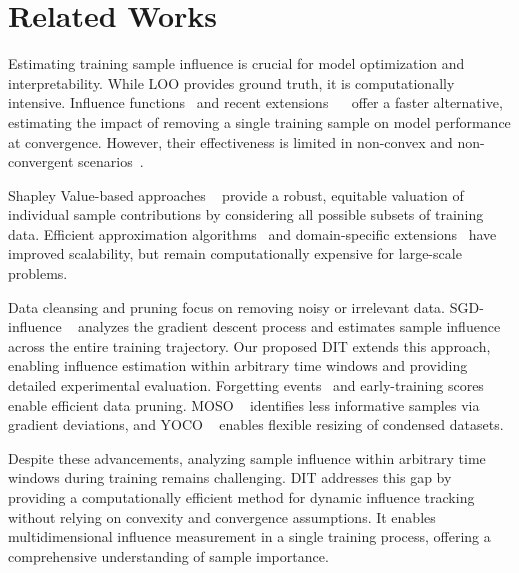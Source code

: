 \section{Related Works}
Estimating training sample influence is crucial for model optimization and interpretability. While LOO provides ground truth, it is computationally intensive. Influence functions~\cite{koh2017understanding} and recent extensions ~\cite{guo2021fastif,schioppa2022scaling,choe2024your}  offer a faster alternative, estimating the impact of removing a single training sample on model performance at convergence. However, their effectiveness is limited in non-convex and non-convergent scenarios~\cite{basu2021influence}. 

Shapley Value-based approaches ~\cite{ghorbani2019data} provide a robust, equitable valuation of individual sample contributions by considering all possible subsets of training data. Efficient approximation algorithms~\cite{jia2019towards,jia2021scalability,xu2021validation} and domain-specific extensions~\cite{schoch2022cs, sun2023shapleyfl,fan2022improving} have improved scalability, but remain computationally expensive for large-scale problems.

Data cleansing and pruning focus on removing noisy or irrelevant data. SGD-influence ~\cite{hara2019data} analyzes the gradient descent process and estimates sample influence across the entire training trajectory. Our proposed DIT extends this approach, enabling influence estimation within arbitrary time windows and providing detailed experimental evaluation. Forgetting events~\cite{toneva2018empirical} and early-training scores~\cite{paul2021deep} enable efficient data pruning. MOSO ~\cite{tan2024data} identifies less informative samples via gradient deviations, and YOCO ~\cite{he2023you} enables flexible resizing of condensed datasets.

Despite these advancements, analyzing sample influence within arbitrary time windows during training remains challenging. DIT addresses this gap by providing a computationally efficient method for dynamic influence tracking without relying on convexity and convergence assumptions. It enables multidimensional influence measurement in a single training process, offering a comprehensive understanding of sample importance.